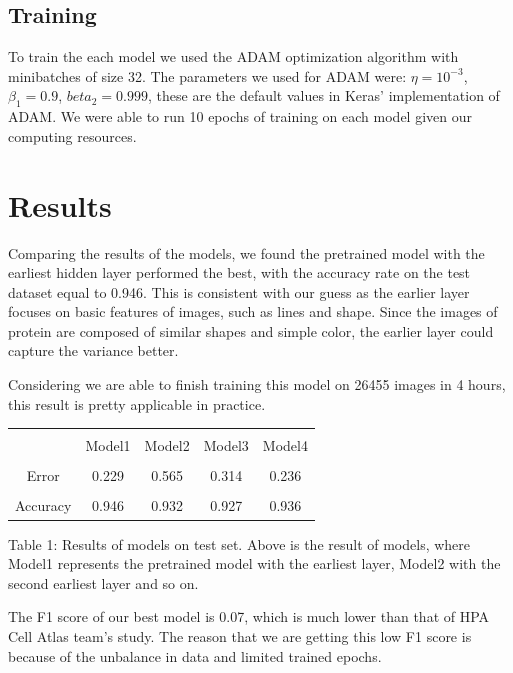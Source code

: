 \documentclass{article}
\begin{document}
\subsection{Training}
To train the each model we used the ADAM optimization algorithm with minibatches of size 32.
The parameters we used for ADAM were: $\eta = 10^{-3}$, $\beta_1 = 0.9$, $beta_2=0.999$, these
are the default values in Keras' implementation of ADAM.
We were able to run 10 epochs of training on each model given our computing resources. 
\section{Results}
Comparing the results of the models, we found the pretrained model with the earliest hidden layer performed the best, with the accuracy rate on the test dataset equal to 0.946. This is consistent with our guess as the earlier layer focuses on basic features of images, such as lines and shape. Since the images of protein are composed of similar shapes and simple color, the earlier layer could capture the variance better. 

Considering we are able to finish training this model on 26455 images in 4 hours, this result is pretty applicable in practice.


\begin{table}[h!]
\centering

\begin{tabular}{|c|c|c|c|c|}
    \hline\\
     &Model1 & Model2&Model3&Model4 \\
     \hline\\
     Error&0.229&0.565&0.314&0.236\\
     \hline\\
     Accuracy&0.946&0.932&0.927&0.936\\
     \hline
\end{tabular}

{\raggedright Table 1: Results of models on test set. Above is the result of models, where Model1 represents the pretrained model with the earliest layer, Model2 with the second earliest layer and so on. \par}

\label{table:1}
\end{table}


The F1 score of our best model is 0.07, which is much lower than that of HPA Cell Atlas team's study. The reason that we are getting this low F1 score is because of the unbalance in data and limited trained epochs.
\end{document}
